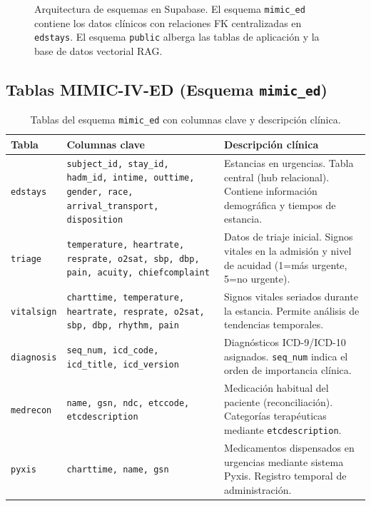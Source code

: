 ﻿\documentclass[11pt,a4paper]{article}
\begin{document}
\begin{figure}[H]
\caption{Arquitectura de esquemas en Supabase. El esquema \texttt{mimic\_ed} contiene los datos cl\'inicos con relaciones FK centralizadas en \texttt{edstays}. El esquema \texttt{public} alberga las tablas de aplicaci\'on y la base de datos vectorial RAG.}
\label{fig:db}
\end{figure}

\subsection{Tablas MIMIC-IV-ED (Esquema \texttt{mimic\_ed})}

\begin{table}[H]
\centering
\caption{Tablas del esquema \texttt{mimic\_ed} con columnas clave y descripci\'on cl\'inica.}
\label{tab:mimic}
\begin{tabularx}{\textwidth}{llX}
\toprule
\textbf{Tabla} & \textbf{Columnas clave} & \textbf{Descripci\'on cl\'inica} \\
\midrule
\texttt{edstays} & \texttt{subject\_id, stay\_id, hadm\_id, intime, outtime, gender, race, arrival\_transport, disposition} & Estancias en urgencias. Tabla central (hub relacional). Contiene informaci\'on demogr\'afica y tiempos de estancia. \\
\addlinespace
\texttt{triage} & \texttt{temperature, heartrate, resprate, o2sat, sbp, dbp, pain, acuity, chiefcomplaint} & Datos de triaje inicial. Signos vitales en la admisi\'on y nivel de acuidad (1=m\'as urgente, 5=no urgente). \\
\addlinespace
\texttt{vitalsign} & \texttt{charttime, temperature, heartrate, resprate, o2sat, sbp, dbp, rhythm, pain} & Signos vitales seriados durante la estancia. Permite an\'alisis de tendencias temporales. \\
\addlinespace
\texttt{diagnosis} & \texttt{seq\_num, icd\_code, icd\_title, icd\_version} & Diagn\'osticos ICD-9/ICD-10 asignados. \texttt{seq\_num} indica el orden de importancia cl\'inica. \\
\addlinespace
\texttt{medrecon} & \texttt{name, gsn, ndc, etccode, etcdescription} & Medicaci\'on habitual del paciente (reconciliaci\'on). Categor\'ias terap\'euticas mediante \texttt{etcdescription}. \\
\addlinespace
\texttt{pyxis} & \texttt{charttime, name, gsn} & Medicamentos dispensados en urgencias mediante sistema Pyxis. Registro temporal de administraci\'on. \\
\bottomrule
\end{tabularx}
\end{table}
\end{document}
